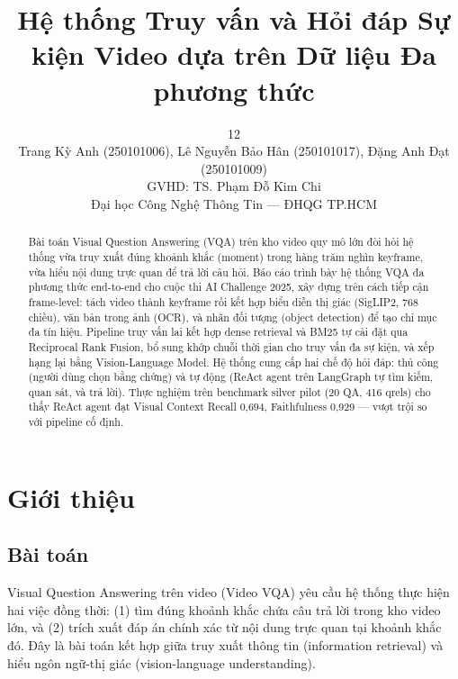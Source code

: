\documentclass[12pt,a4paper,onecolumn]{article}
\begin{document}
\title{Hệ thống Truy vấn và Hỏi đáp Sự kiện Video dựa trên Dữ liệu Đa phương thức}
\author{12 \\ Trang Kỳ Anh (250101006), Lê Nguyễn Bảo Hân (250101017), Đặng Anh Đạt (250101009)
  \\[4pt]
  \normalsize GVHD: TS. Phạm Đỗ Kim Chi \\ Đại học Công Nghệ Thông Tin — ĐHQG TP.HCM
}
\date{}
\maketitle
\begin{abstract}
Bài toán Visual Question Answering (VQA) trên kho video quy mô lớn đòi hỏi hệ thống vừa truy xuất đúng khoảnh khắc (moment) trong hàng trăm nghìn keyframe, vừa hiểu nội dung trực quan để trả lời câu hỏi. Báo cáo trình bày hệ thống VQA đa phương thức end-to-end cho cuộc thi AI Challenge 2025, xây dựng trên cách tiếp cận frame-level: tách video thành keyframe rồi kết hợp biểu diễn thị giác (SigLIP2, 768 chiều), văn bản trong ảnh (OCR), và nhãn đối tượng (object detection) để tạo chỉ mục đa tín hiệu. Pipeline truy vấn lai kết hợp dense retrieval và BM25 tự cài đặt qua Reciprocal Rank Fusion, bổ sung khớp chuỗi thời gian cho truy vấn đa sự kiện, và xếp hạng lại bằng Vision-Language Model. Hệ thống cung cấp hai chế độ hỏi đáp: thủ công (người dùng chọn bằng chứng) và tự động (ReAct agent trên LangGraph tự tìm kiếm, quan sát, và trả lời). Thực nghiệm trên benchmark silver pilot (20 QA, 416 qrels) cho thấy ReAct agent đạt Visual Context Recall 0,694, Faithfulness 0,929 — vượt trội so với pipeline cố định.

\end{abstract}

\section{Giới thiệu}

\subsection{Bài toán}

Visual Question Answering trên video (Video VQA) yêu cầu hệ thống thực hiện hai việc đồng thời: (1) tìm đúng khoảnh khắc chứa câu trả lời trong kho video lớn, và (2) trích xuất đáp án chính xác từ nội dung trực quan tại khoảnh khắc đó. Đây là bài toán kết hợp giữa truy xuất thông tin (information retrieval) và hiểu ngôn ngữ-thị giác (vision-language understanding).
\end{document}
